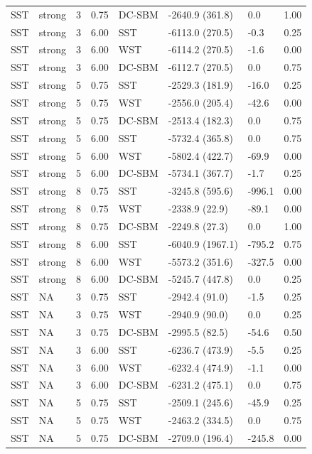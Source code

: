 \begin{table}
\begin{tabular}[t]{llrrllll}
SST & strong & 3 & 0.75 & DC-SBM & -2640.9 (361.8) & 0.0 & 1.00\\
SST & strong & 3 & 6.00 & SST & -6113.0 (270.5) & -0.3 & 0.25\\
SST & strong & 3 & 6.00 & WST & -6114.2 (270.5) & -1.6 & 0.00\\
SST & strong & 3 & 6.00 & DC-SBM & -6112.7 (270.5) & 0.0 & 0.75\\
SST & strong & 5 & 0.75 & SST & -2529.3 (181.9) & -16.0 & 0.25\\
\addlinespace
SST & strong & 5 & 0.75 & WST & -2556.0 (205.4) & -42.6 & 0.00\\
SST & strong & 5 & 0.75 & DC-SBM & -2513.4 (182.3) & 0.0 & 0.75\\
SST & strong & 5 & 6.00 & SST & -5732.4 (365.8) & 0.0 & 0.75\\
SST & strong & 5 & 6.00 & WST & -5802.4 (422.7) & -69.9 & 0.00\\
SST & strong & 5 & 6.00 & DC-SBM & -5734.1 (367.7) & -1.7 & 0.25\\
\addlinespace
SST & strong & 8 & 0.75 & SST & -3245.8 (595.6) & -996.1 & 0.00\\
SST & strong & 8 & 0.75 & WST & -2338.9 (22.9) & -89.1 & 0.00\\
SST & strong & 8 & 0.75 & DC-SBM & -2249.8 (27.3) & 0.0 & 1.00\\
SST & strong & 8 & 6.00 & SST & -6040.9 (1967.1) & -795.2 & 0.75\\
SST & strong & 8 & 6.00 & WST & -5573.2 (351.6) & -327.5 & 0.00\\
\addlinespace
SST & strong & 8 & 6.00 & DC-SBM & -5245.7 (447.8) & 0.0 & 0.25\\
SST & NA & 3 & 0.75 & SST & -2942.4 (91.0) & -1.5 & 0.25\\
SST & NA & 3 & 0.75 & WST & -2940.9 (90.0) & 0.0 & 0.25\\
SST & NA & 3 & 0.75 & DC-SBM & -2995.5 (82.5) & -54.6 & 0.50\\
SST & NA & 3 & 6.00 & SST & -6236.7 (473.9) & -5.5 & 0.25\\
\addlinespace
SST & NA & 3 & 6.00 & WST & -6232.4 (474.9) & -1.1 & 0.00\\
SST & NA & 3 & 6.00 & DC-SBM & -6231.2 (475.1) & 0.0 & 0.75\\
SST & NA & 5 & 0.75 & SST & -2509.1 (245.6) & -45.9 & 0.25\\
SST & NA & 5 & 0.75 & WST & -2463.2 (334.5) & 0.0 & 0.75\\
SST & NA & 5 & 0.75 & DC-SBM & -2709.0 (196.4) & -245.8 & 0.00\\

\end{tabular}
\end{table}
